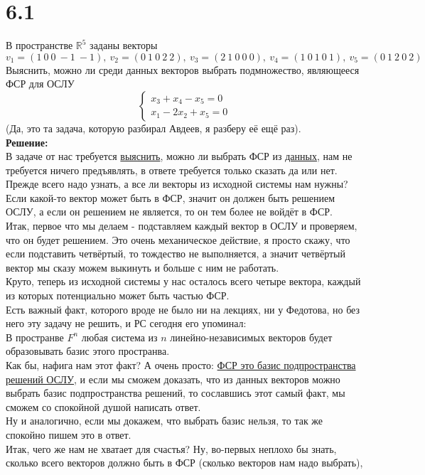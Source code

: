 \documentclass[a4paper,11pt]{report}
\begin{document}
\section{6.1}
В пространстве $\mathbb{R}^5$ заданы векторы
\[
v_1 = (1\ 0\ 0\ -1\ -1),\
v_2 = (0\ 1\ 0\ 2\ 2),\ 
v_3 = (2\ 1\ 0\ 0\ 0),\
v_4 = (1\ 0\ 1\ 0\ 1),\
v_5 = (0\ 1\ 2\ 0\ 2) \
\]
Выяснить, можно ли среди данных векторов выбрать подмножество, являющееся ФСР для ОСЛУ
\[
\begin{cases}
x_3 + x_4 - x_5 = 0\\
x_1 - 2x_2 + x_5 = 0
\end{cases}
\]
(Да, это та задача, которую разбирал Авдеев, я разберу её ещё раз).\\
\textbf{Решение:}\\
В задаче от нас требуется \underline{выяснить}, можно ли выбрать ФСР из \underline{данных}, нам не требуется ничего предъявлять, в ответе
требуется только сказать да или нет.\\
Прежде всего надо узнать, а все ли векторы из исходной системы нам нужны? Если какой-то вектор может быть в ФСР, значит он должен быть
решением ОСЛУ, а если он решением не является, то он тем более не войдёт в ФСР.\\
Итак, первое что мы делаем - подставляем каждый вектор в ОСЛУ и проверяем, что он будет решением. Это очень механическое действие, я просто
скажу, что если подставить четвёртый, то тождество не выполняется, а значит четвёртый вектор мы сказу можем выкинуть и больше с ним не работать.
\\
Круто, теперь из исходной системы у нас осталось всего четыре вектора, каждый из которых потенциально может быть частью ФСР.\\
Есть важный факт, которого вроде не было ни на лекциях, ни у Федотова, но без него эту задачу не решить, и РС сегодня его упоминал:\\
В пространве $F^n$ любая система из $n$ линейно-независимых векторов будет образовывать базис этого пространва.\\
Как бы, нафига нам этот факт? А очень просто: \underline{ФСР это базис подпространства решений ОСЛУ}, и если мы сможем доказать, что
из данных векторов можно выбрать базис подпространства решений, то сославшись этот самый факт, мы сможем со спокойной душой написать ответ.\\
Ну и аналогично, если мы докажем, что выбрать базис нельзя, то так же спокойно пишем это в ответ.\\
Итак, чего же нам не хватает для счастья? Ну, во-первых неплохо бы знать, сколько всего векторов должно быть в ФСР (сколько векторов нам надо выбрать),
\end{document}
